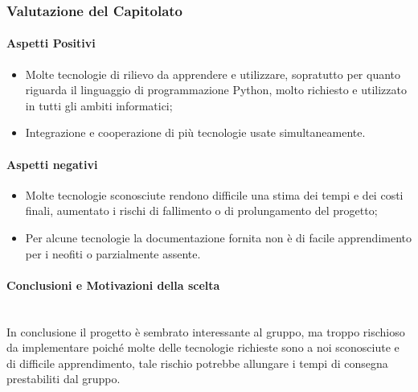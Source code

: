 \subsubsection{Valutazione del Capitolato}

\paragraph{Aspetti Positivi}
\begin{itemize}
	\item Molte tecnologie di rilievo da apprendere e utilizzare, sopratutto per quanto riguarda il linguaggio di programmazione Python, molto richiesto e utilizzato in tutti gli ambiti informatici;
	\item Integrazione e cooperazione di più tecnologie usate simultaneamente. 
\end{itemize}

\paragraph{Aspetti negativi}
\begin{itemize}
	\item Molte tecnologie sconosciute rendono difficile una stima dei tempi e dei costi finali, aumentato i rischi di fallimento o di prolungamento del progetto; 
	\item Per alcune tecnologie la documentazione fornita non è di facile apprendimento per i neofiti o parzialmente assente. 
\end{itemize}


\paragraph{Conclusioni e Motivazioni della scelta}\-\\
In conclusione il progetto è sembrato interessante al gruppo, ma troppo rischioso da implementare poiché molte delle tecnologie richieste sono a noi sconosciute e di difficile apprendimento, tale rischio potrebbe allungare i tempi di consegna prestabiliti dal gruppo.  

